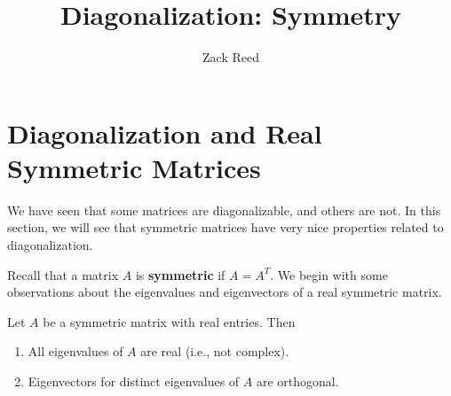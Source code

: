 \documentclass{ximera}
\author{Zack Reed}
\title{Diagonalization: Symmetry}
\begin{document}
\begin{abstract}

\end{abstract}
\maketitle

\section*{Diagonalization and Real Symmetric Matrices}

We have seen that some matrices are diagonalizable, and others are not. In this section, we will see that
symmetric matrices have very nice properties related to diagonalization. 

\begin{remark}
  Recall that a matrix $A$ is
  \textbf{symmetric} if $A=A^T$. We begin with some observations
  about the eigenvalues and eigenvectors of a real symmetric matrix.
\end{remark}

\begin{proposition}\label{prop:eigenvalues-symmetric}

  Let $A$ be a symmetric matrix with real entries. Then

    \begin{enumerate}
    \item All eigenvalues of $A$ are real (i.e., not complex).
    \item Eigenvectors for distinct eigenvalues of $A$ are orthogonal.
    \end{enumerate}

\end{proposition}
\end{document}
